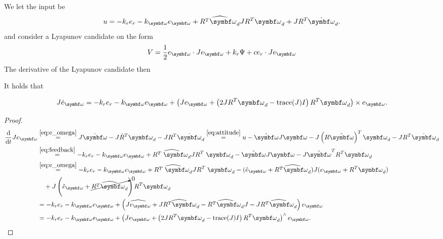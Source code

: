 We let the input be
\begin{equation}
  u = -k_r e_r - k_\bomega e_\bomega + \widehat{R^T \bomega_d} J R^T \bomega_d + J R^T \dot \bomega_d.
\end{equation}
and consider a Lyapunov candidate on the form
\begin{equation}
  V = \frac{1}{2} e_\bomega \cdot J e_\bomega + k_r \Psi + c e_r \cdot J e_\bomega
\end{equation}
The derivative of the Lyapunov candidate then \begin{proposition}
  It holds that
\end{proposition}
\begin{equation}
  \label{eq:myJeo_dot}
  J \dot e_\bomega = -k_r e_r - k_\bomega e_\bomega + \left( J e_\bomega + \left(2 J R^T \bomega_d - \text{trace}(J) I \right) R^T \bomega_d \right) \times e_\bomega.
\end{equation}
\begin{proof}
  \begin{equation*}
    \begin{aligned}
      \frac{\mathrm{d}}{\mathrm{d}t} J e_\bomega & \overset{\eqref{eq:e_omega}}= J \dot \bomega - J \dot R^T \bomega_d - J R^T \dot \bomega_d \overset{\eqref{eq:attitude}}= u - \hat \bomega J \bomega - J \left( R \hat \bomega \right)^T \bomega_d - J R^T \dot \bomega_d \\
                                                 & \overset{\eqref{eq:feedback}}= -k_r e_r - k_\bomega e_\bomega + \widehat{R^T \; {\bomega_d}} J R^T \; {\bomega_d} - \hat \bomega J \bomega - J \hat \bomega^T R^T \bomega_d                                               \\
                                                 & \overset{\eqref{eq:e_omega}}= -k_r e_r - k_\bomega e_\bomega + \widehat{R^T \; {\bomega_d}} J R^T \; {\bomega_d} - (\hat e_\bomega + \widehat{R^T \bomega_d}) J (e_\bomega + {R^T \bomega_d})   \\
                                                 & \quad + J \left( \hat e_\bomega + \cancelto{0}{\widehat{R^T \bomega_d}} \right) R^T \bomega_d                                                                                                                             \\
                                                 & = -k_r e_r - k_\bomega e_\bomega + \left( \widehat{J e_\bomega} + \widehat{J R^T \bomega_d} - \widehat{R^T \bomega_d} J - J \widehat{R^T \bomega_d} \right) e_\bomega                     \\
                                                 & = -k_r e_r - k_\bomega e_\bomega + \left( J e_\bomega + \left(2 J R^T \bomega_d - \text{trace}(J) I \right) R^T \bomega_d \right)^\wedge e_\bomega.
    \end{aligned}
  \end{equation*}
\end{proof}

